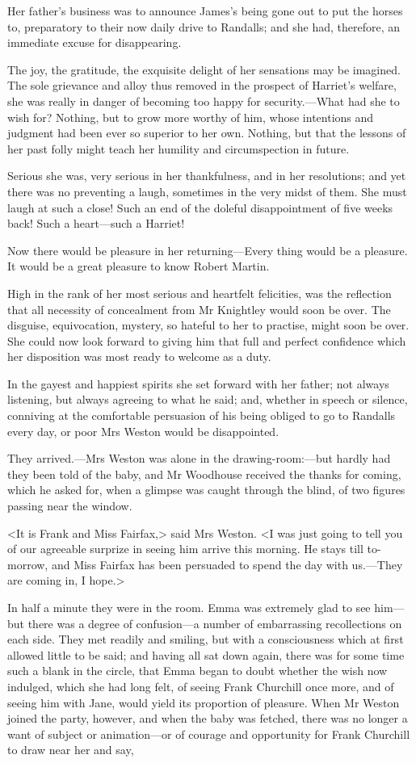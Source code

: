 Her father's business was to announce James's being gone out to put the horses to, preparatory to their now daily drive to Randalls; and she had, therefore, an immediate excuse for disappearing.

The joy, the gratitude, the exquisite delight of her sensations may be imagined. The sole grievance and alloy thus removed in the prospect of Harriet's welfare, she was really in danger of becoming too happy for security.—What had she to wish for? Nothing, but to grow more worthy of him, whose intentions and judgment had been ever so superior to her own. Nothing, but that the lessons of her past folly might teach her humility and circumspection in future.

Serious she was, very serious in her thankfulness, and in her resolutions; and yet there was no preventing a laugh, sometimes in the very midst of them. She must laugh at such a close! Such an end of the doleful disappointment of five weeks back! Such a heart—such a Harriet!

Now there would be pleasure in her returning—Every thing would be a pleasure. It would be a great pleasure to know Robert Martin.

High in the rank of her most serious and heartfelt felicities, was the reflection that all necessity of concealment from Mr Knightley would soon be over. The disguise, equivocation, mystery, so hateful to her to practise, might soon be over. She could now look forward to giving him that full and perfect confidence which her disposition was most ready to welcome as a duty.

In the gayest and happiest spirits she set forward with her father; not always listening, but always agreeing to what he said; and, whether in speech or silence, conniving at the comfortable persuasion of his being obliged to go to Randalls every day, or poor Mrs Weston would be disappointed.

They arrived.—Mrs Weston was alone in the drawing-room:—but hardly had they been told of the baby, and Mr Woodhouse received the thanks for coming, which he asked for, when a glimpse was caught through the blind, of two figures passing near the window.

<It is Frank and Miss Fairfax,> said Mrs Weston. <I was just going to tell you of our agreeable surprize in seeing him arrive this morning. He stays till to-morrow, and Miss Fairfax has been persuaded to spend the day with us.—They are coming in, I hope.>

In half a minute they were in the room. Emma was extremely glad to see him—but there was a degree of confusion—a number of embarrassing recollections on each side. They met readily and smiling, but with a consciousness which at first allowed little to be said; and having all sat down again, there was for some time such a blank in the circle, that Emma began to doubt whether the wish now indulged, which she had long felt, of seeing Frank Churchill once more, and of seeing him with Jane, would yield its proportion of pleasure. When Mr Weston joined the party, however, and when the baby was fetched, there was no longer a want of subject or animation—or of courage and opportunity for Frank Churchill to draw near her and say,

